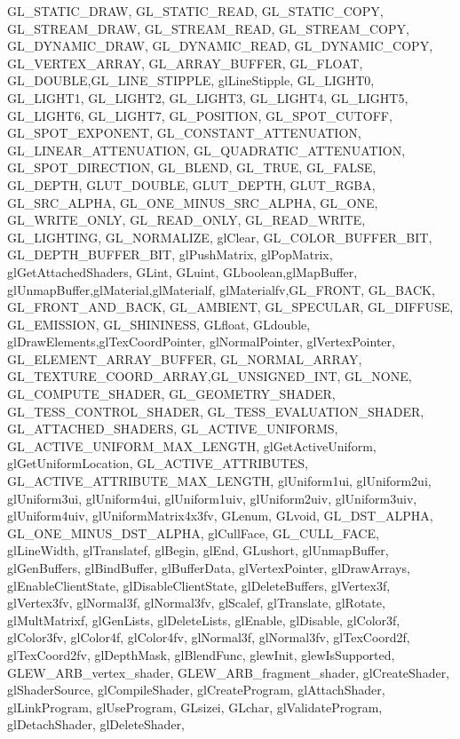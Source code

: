 {{{			GL_STATIC_DRAW, GL_STATIC_READ, GL_STATIC_COPY,
			GL_STREAM_DRAW, GL_STREAM_READ, GL_STREAM_COPY,
			GL_DYNAMIC_DRAW, GL_DYNAMIC_READ, GL_DYNAMIC_COPY,
			GL_VERTEX_ARRAY, GL_ARRAY_BUFFER, GL_FLOAT, GL_DOUBLE,GL_LINE_STIPPLE, glLineStipple,
			GL_LIGHT0, GL_LIGHT1, GL_LIGHT2, GL_LIGHT3, GL_LIGHT4, GL_LIGHT5, GL_LIGHT6, GL_LIGHT7, 
			GL_POSITION, GL_SPOT_CUTOFF, GL_SPOT_EXPONENT, GL_CONSTANT_ATTENUATION, GL_LINEAR_ATTENUATION, GL_QUADRATIC_ATTENUATION, GL_SPOT_DIRECTION,
			GL_BLEND, GL_TRUE, GL_FALSE, GL_DEPTH, GLUT_DOUBLE, GLUT_DEPTH, GLUT_RGBA, GL_SRC_ALPHA, GL_ONE_MINUS_SRC_ALPHA, GL_ONE, GL_WRITE_ONLY, GL_READ_ONLY, GL_READ_WRITE,
			GL_LIGHTING, GL_NORMALIZE,
			glClear,
			GL_COLOR_BUFFER_BIT, GL_DEPTH_BUFFER_BIT,
			glPushMatrix, glPopMatrix, glGetAttachedShaders,
			GLint, GLuint,
			GLboolean,glMapBuffer, glUnmapBuffer,glMaterial,glMaterialf, glMaterialfv,GL_FRONT, GL_BACK, GL_FRONT_AND_BACK, GL_AMBIENT, GL_SPECULAR, GL_DIFFUSE, GL_EMISSION, GL_SHININESS,
			GLfloat, GLdouble, glDrawElements,glTexCoordPointer, glNormalPointer, glVertexPointer, GL_ELEMENT_ARRAY_BUFFER, GL_NORMAL_ARRAY, GL_TEXTURE_COORD_ARRAY,GL_UNSIGNED_INT,
            GL_NONE,
            GL_COMPUTE_SHADER,
            GL_GEOMETRY_SHADER,
            GL_TESS_CONTROL_SHADER,
            GL_TESS_EVALUATION_SHADER,
            GL_ATTACHED_SHADERS,
            GL_ACTIVE_UNIFORMS,
            GL_ACTIVE_UNIFORM_MAX_LENGTH,
            glGetActiveUniform,
            glGetUniformLocation,
            GL_ACTIVE_ATTRIBUTES,
            GL_ACTIVE_ATTRIBUTE_MAX_LENGTH,
            glUniform1ui,
            glUniform2ui,
            glUniform3ui,
            glUniform4ui,
            glUniform1uiv,
            glUniform2uiv,
            glUniform3uiv,
            glUniform4uiv,
            glUniformMatrix4x3fv,
			GLenum,
			GLvoid, GL_DST_ALPHA, GL_ONE_MINUS_DST_ALPHA, glCullFace, GL_CULL_FACE, glLineWidth, glTranslatef,
			glBegin, glEnd, GLushort,
			glUnmapBuffer, glGenBuffers, glBindBuffer, glBufferData, glVertexPointer, glDrawArrays, glEnableClientState, glDisableClientState, glDeleteBuffers,
			glVertex3f, glVertex3fv, glNormal3f, glNormal3fv, glScalef, glTranslate, glRotate, glMultMatrixf, glGenLists, glDeleteLists, glEnable, glDisable,
			glColor3f, glColor3fv, glColor4f, glColor4fv,
			glNormal3f, glNormal3fv,
			glTexCoord2f, glTexCoord2fv, glDepthMask, glBlendFunc, glewInit, glewIsSupported, GLEW_ARB_vertex_shader, GLEW_ARB_fragment_shader,
			glCreateShader, glShaderSource, glCompileShader, glCreateProgram, glAttachShader, glLinkProgram, glUseProgram, GLsizei, GLchar, glValidateProgram, glDetachShader, glDeleteShader,
}}}
